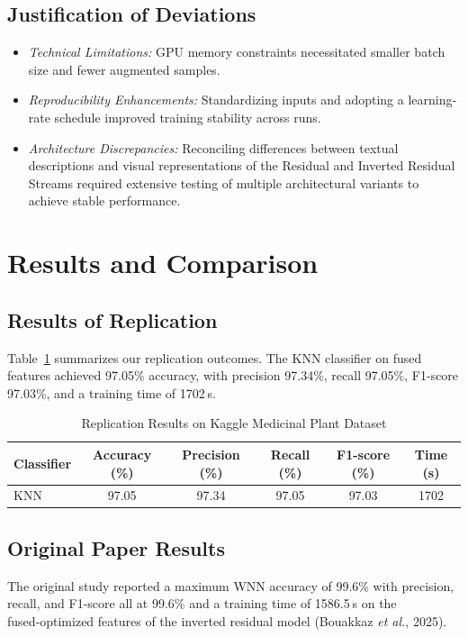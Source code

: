 \documentclass[journal,onecolumn]{IEEEtran}
\begin{document}
\subsection{Justification of Deviations}
\begin{itemize}
  \item \emph{Technical Limitations:} GPU memory constraints necessitated smaller batch size and fewer augmented samples.
  \item \emph{Reproducibility Enhancements:} Standardizing inputs and adopting a learning‐rate schedule improved training stability across runs.
  \item \emph{Architecture Discrepancies:} Reconciling differences between textual descriptions and visual representations of the Residual and Inverted Residual Streams required extensive testing of multiple architectural variants to achieve stable performance.
\end{itemize}


\section{Results and Comparison}
\subsection{Results of Replication}
Table~\ref{tab:replication_results} summarizes our replication outcomes. The KNN classifier on fused features achieved 97.05\% accuracy, with precision 97.34\%, recall 97.05\%, F1-score 97.03\%, and a training time of 1702 s.

\begin{table}[ht]
  \centering
  \caption{Replication Results on Kaggle Medicinal Plant Dataset}
  \label{tab:replication_results}
  \begin{tabular}{lccccc}
    \hline
    Classifier & Accuracy (\%) & Precision (\%) & Recall (\%) & F1-score (\%) & Time (s) \\
    \hline
    KNN & 97.05 & 97.34 & 97.05 & 97.03 & 1702 \\
    \hline
  \end{tabular}
\end{table}

\subsection{Original Paper Results}
The original study reported a maximum WNN accuracy of 99.6\% with precision, recall, and F1-score all at 99.6\% and a training time of 1586.5 s on the fused‑optimized features of the inverted residual model (Bouakkaz \textit{et al.}, 2025).
\end{document}
